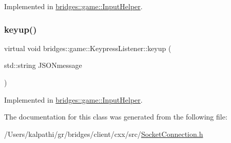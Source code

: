 Implemented in \mbox{\hyperlink{classbridges_1_1game_1_1_input_helper_aac75c2b1abf28afa4acaf730e925f301}{bridges\+::game\+::\+Input\+Helper}}.

\mbox{\label{classbridges_1_1game_1_1_keypress_listener_a21d9f085819e30c41f3964ea2276964d}} 
\subsubsection{\texorpdfstring{keyup()}{keyup()}}
{\footnotesize\ttfamily virtual void bridges\+::game\+::\+Keypress\+Listener\+::keyup (\begin{DoxyParamCaption}\item[{std\+::string}]{J\+S\+O\+Nmessage }\end{DoxyParamCaption})\hspace{0.3cm}{\ttfamily [pure virtual]}}



Implemented in \mbox{\hyperlink{classbridges_1_1game_1_1_input_helper_aa847f19c6f68ebbb63d73802abfcd9a0}{bridges\+::game\+::\+Input\+Helper}}.



The documentation for this class was generated from the following file\+:\begin{DoxyCompactItemize}
\item 
/\+Users/kalpathi/gr/bridges/client/cxx/src/\mbox{\hyperlink{_socket_connection_8h}{Socket\+Connection.\+h}}\end{DoxyCompactItemize}
